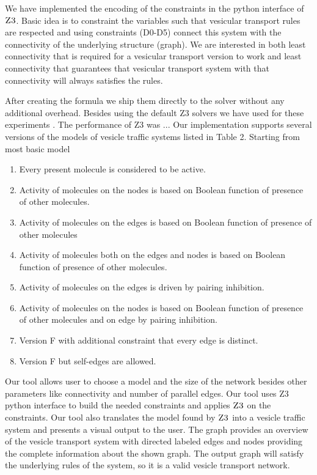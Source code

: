 We have implemented the encoding of the constraints
in the python interface of $\textsc{Z3}$. Basic idea is to constraint the variables such that vesicular transport rules are respected and using constraints (D0-D5) connect this system with the connectivity of the underlying structure (graph). We are interested in both least connectivity that is required for a vesicular transport version to work and least connectivity that guarantees that vesicular transport system with that connectivity will always satisfies the rules.

After creating the formula we ship them directly to the solver without any additional overhead. Besides using the default Z3 solvers we have used for these experiments . The performance of Z3 was ...
%
Our implementation supports several versions of the
models of vesicle traffic systems listed in Table 2. Starting from most basic model  

\begin{enumerate}[label=\Alph*]
\item Every present molecule is considered to be active.
\item Activity of molecules on the nodes is based on Boolean function of presence of other molecules. 
\item Activity of molecules on the edges is based on Boolean function of presence of other molecules
\item Activity of molecules both on the edges and nodes is based on Boolean function of presence of other molecules.
\item Activity of molecules on the edges is driven by pairing inhibition.
\item Activity of molecules on the nodes is based on Boolean function of presence of other molecules and on edge by pairing inhibition.
\item Version F with additional constraint that every edge is distinct.
\item Version F but self-edges are allowed.
\end{enumerate}
%
Our tool allows user to choose a model and the size of
the network besides other parameters like connectivity and number of parallel edges. 
%
Our tool uses Z3 python interface to build the needed constraints and applies $\textsc{Z3}$
on the constraints. 
%
Our tool also translates the model found by $\textsc{Z3}$
into a vesicle traffic system and presents a visual
output to the user. The graph provides an overview of the vesicle transport system with directed labeled edges and nodes providing the complete information about the shown graph. The output graph will satisfy the underlying rules of the system, so it is a valid vesicle transport network.

